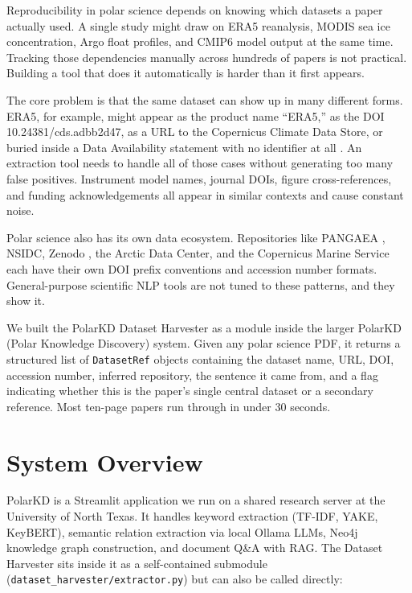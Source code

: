 \documentclass[sigconf]{acmart}
\begin{document}
Reproducibility in polar science depends on knowing which datasets a paper actually
used. A single study might draw on ERA5 reanalysis, MODIS sea ice concentration,
Argo float profiles, and CMIP6 model output at the same time. Tracking those
dependencies manually across hundreds of papers is not practical. Building a tool
that does it automatically is harder than it first appears.

The core problem is that the same dataset can show up in many different forms. ERA5,
for example, might appear as the product name ``ERA5,'' as the DOI
10.24381/cds.adbb2d47, as a URL to the Copernicus Climate Data Store, or buried
inside a Data Availability statement with no identifier at all \cite{era5}. An
extraction tool needs to handle all of those cases without generating too many false
positives. Instrument model names, journal DOIs, figure cross-references, and funding
acknowledgements all appear in similar contexts and cause constant noise.

Polar science also has its own data ecosystem. Repositories like PANGAEA \cite{pangaea},
NSIDC, Zenodo \cite{zenodo}, the Arctic Data Center, and the Copernicus Marine
Service each have their own DOI prefix conventions and accession number formats.
General-purpose scientific NLP tools \cite{luan2018,wadden2019,scibert} are not
tuned to these patterns, and they show it.

We built the PolarKD Dataset Harvester as a module inside the larger PolarKD
(Polar Knowledge Discovery) system. Given any polar science PDF, it returns a
structured list of \texttt{DatasetRef} objects containing the dataset name, URL,
DOI, accession number, inferred repository, the sentence it came from, and a flag
indicating whether this is the paper's single central dataset or a secondary
reference. Most ten-page papers run through in under 30 seconds.

\section{System Overview}

PolarKD is a Streamlit application we run on a shared research server at the
University of North Texas. It handles keyword extraction (TF-IDF, YAKE, KeyBERT),
semantic relation extraction via local Ollama LLMs, Neo4j knowledge graph
construction, and document Q\&A with RAG. The Dataset Harvester sits inside it as a
self-contained submodule (\texttt{dataset\_harvester/extractor.py}) but can also be
called directly:
\end{document}

